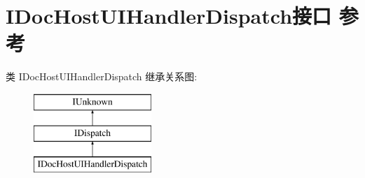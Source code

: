 \hypertarget{interface_i_doc_host_u_i_handler_dispatch}{}\section{I\+Doc\+Host\+U\+I\+Handler\+Dispatch接口 参考}
\label{interface_i_doc_host_u_i_handler_dispatch}
类 I\+Doc\+Host\+U\+I\+Handler\+Dispatch 继承关系图\+:\begin{figure}[H]
\begin{center}
\leavevmode
\includegraphics[height=3.000000cm]{interface_i_doc_host_u_i_handler_dispatch}
\end{center}
\end{figure}
